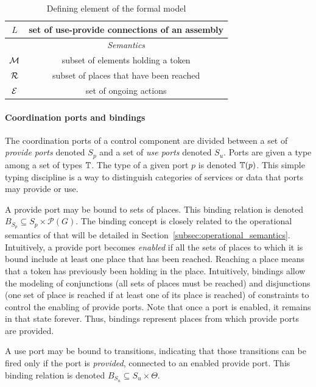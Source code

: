 \begin{table}[tp]
{\begin{tabular}{|c|c|}
      $L$ & set of use-provide connections of an assembly\\
      \hline
      \hline
      & \emph{Semantics}\\
      \hline
      $\mathcal{M}$ & subset of elements holding a token\\
      $\mathcal{R}$ & subset of places that have been reached\\
      $\mathcal{E}$ & set of ongoing actions\\
      \hline
    \end{tabular}
  }
  \caption{Defining element of the \mad formal model}
  \label{tab:not}
\end{table}

\paragraph{Coordination ports and bindings}{

The coordination ports of a control component are divided between a set of \emph{provide ports} denoted $S_p$ and a set of \emph{use ports} denoted $S_u$. Ports are given a type among a set of types $\mathbb{T}$. The type of a given port $p$ is denoted $\mathbb{T}(p)$. This simple typing discipline is a way to distinguish categories of services or data that ports may provide or use.

A provide port may be bound to sets of places. This binding relation is denoted $B_{S_p} \subseteq S_p \times \mathcal{P}(G)$. The binding concept is closely related to the operational semantics of \mad that will be detailed in Section~\ref{subsec:operational_semantics}. Intuitively, a provide port becomes \emph{enabled} if all the sets of places to which it is bound include at least one place that has been reached. Reaching a place means that a token has previously been holding in the place. Intuitively, bindings allow the modeling of conjunctions (all sets of places must be reached) and disjunctions (one set of place is reached if at least one of its place is reached) of constraints to control the enabling of provide ports. Note that once a port is enabled, it remains in that state forever. Thus, bindings represent places from which provide ports are provided.

A use port may be bound to transitions, indicating that those transitions can be fired only if the port is \emph{provided}, \ie connected to an enabled provide port. This binding relation is denoted $B_{S_{u}} \subseteq S_u \times \Theta$.

}
